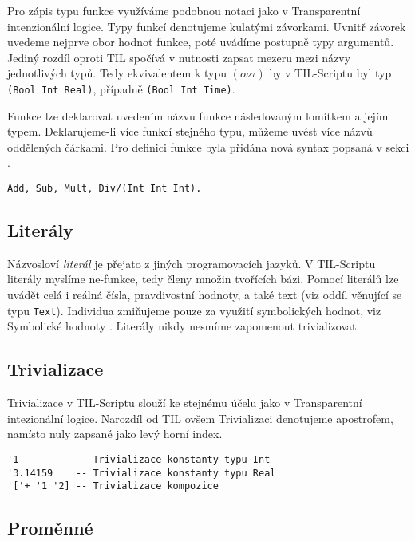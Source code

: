 Pro zápis typu funkce využíváme podobnou notaci jako v Transparentní intenzionální logice.
Typy funkcí denotujeme kulatými závorkami. Uvnitř závorek uvedeme nejprve obor hodnot funkce,
poté uvádíme postupně typy argumentů. Jediný rozdíl oproti TIL spočívá v nutnosti zapsat mezeru
mezi názvy jednotlivých typů. Tedy ekvivalentem k typu $(o\nu\tau)$ by v TIL-Scriptu byl typ
\lstinline{(Bool Int Real)}, případně \lstinline{(Bool Int Time)}.

Funkce lze deklarovat uvedením názvu funkce následovaným lomítkem a jejím typem. Deklarujeme-li
více funkcí stejného typu, můžeme uvést více názvů oddělených čárkami. Pro definici funkce byla
přidána nová syntax popsaná v sekci .

\begin{lstlisting}[caption={Deklarace funkcí}]
Add, Sub, Mult, Div/(Int Int Int).
\end{lstlisting}

\subsection{Literály}

Názvosloví \textit{literál} je přejato z jiných programovacích jazyků. V TIL-Scriptu literály
myslíme ne-funkce, tedy členy množin tvořících bázi. Pomocí literálů lze uvádět celá i reálná
čísla, pravdivostní hodnoty, a také text (viz oddíl  věnující se typu
\lstinline{Text}). Individua zmiňujeme pouze za využití symbolických hodnot, viz Symbolické hodnoty
. Literály nikdy nesmíme zapomenout trivializovat.

\subsection{Trivializace}

Trivializace v TIL-Scriptu slouží ke stejnému účelu jako v Transparentní intezionální logice.
Narozdíl od TIL ovšem Trivializaci denotujeme apostrofem, namísto nuly zapsané jako levý horní
index.

\begin{lstlisting}[caption={Příklad Trivializace.}]
'1          -- Trivializace konstanty typu Int
'3.14159    -- Trivializace konstanty typu Real
'['+ '1 '2] -- Trivializace kompozice
\end{lstlisting}

\subsection{Proměnné}

